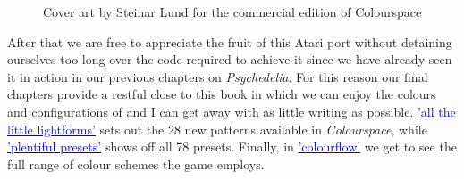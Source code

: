 \clearpage
\begin{figure}[H]
    \centering
    \begin{adjustbox}{width=12cm,center}
    \end{adjustbox}
\caption{Cover art by Steinar Lund for the commercial edition of Colourspace}
\end{figure}
\clearpage
After that we are free to appreciate the fruit of this Atari port without detaining ourselves too long over the code
required to achieve it since we have already seen it in action in our previous chapters on \textit{Psychedelia}.
For this reason our final chapters provide a restful close to this book in which we can enjoy the colours
and configurations of  and I can get away with as little writing as possible.
\hyperref[sec:lightforms]{\textcolor{blue}{'all the little lightforms'}}
sets out the 28 new patterns available
in \textit{Colourspace}, while 
\hyperref[sec:colourspace_presets]{\textcolor{blue}{'plentiful presets'}}
shows off all 78 presets. Finally, in
\hyperref[sec:colourflow]{\textcolor{blue}{'colourflow'}} we get to see the full range of colour schemes
the game employs.

  



